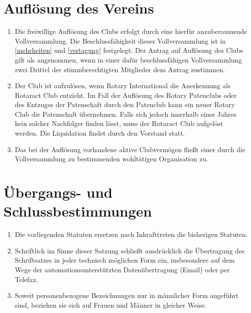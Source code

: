 \documentclass{statutclass}
\begin{document}
\section{Auflösung des Vereins}\label{aufloesung}
\begin{enumerate}
    \item Die freiwillige Auflösung des Clubs erfolgt durch eine hierfür anzuberaumende Vollversammlung. Die Beschlussfähigkeit dieser Vollversammlung ist in \ref{mehrheiten} und \ref{vertagung} festgelegt. Der Antrag auf Auflösung des Clubs gilt als angenommen, wenn in einer dafür beschlussfähigen Vollversammlung zwei Drittel der stimmberechtigten Mitglieder dem Antrag zustimmen.
    \item Der Club ist aufzulösen, wenn Rotary International die Anerkennung als Rotaract Club entzieht. Im Fall der Auflösung des Rotary Patenclubs oder des Entzuges der Patenschaft durch den Patenclub kann ein neuer Rotary Club die Patenschaft übernehmen. Falls sich jedoch innerhalb eines Jahres kein solcher Nachfolger finden lässt, muss der Rotaract Club aufgelöst werden. Die Liquidation findet durch den Vorstand statt.
    \item Das bei der Auflösung vorhandene aktive Clubvermögen fließt einer durch die Vollversammlung zu bestimmenden wohltätigen Organisation zu.
\end{enumerate}

\section{Übergangs- und Schlussbestimmungen}
\begin{enumerate}
    \item Die vorliegenden Statuten ersetzen nach Inkrafttreten die bisherigen Statuten.
    \item \glqq{}Schriftlich\grqq{} im Sinne dieser Satzung schließt ausdrücklich die Übertragung des Schriftsatzes in jeder technisch möglichen Form ein, insbesondere auf dem Wege der automationsunterstützten Datenübertragung (Email) oder per Telefax.
    \item Soweit personenbezogene Bezeichnungen nur in männlicher Form angeführt sind, beziehen sie sich auf Frauen und Männer in gleicher Weise.
\end{enumerate}
\end{document}
